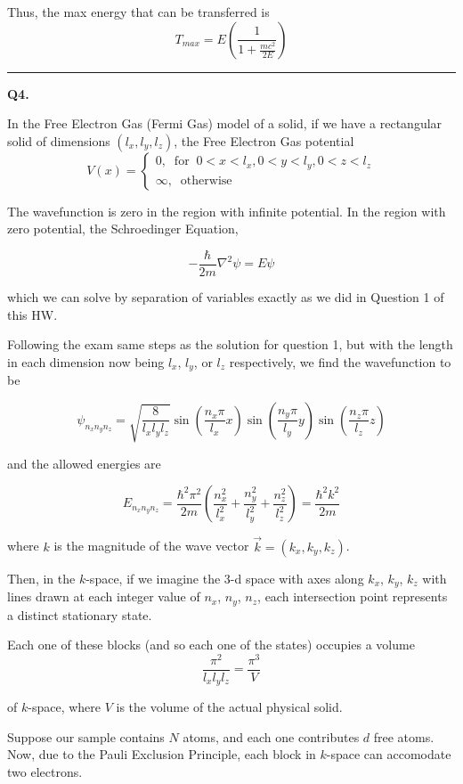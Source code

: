 \documentclass[twoside]{article}
\begin{document}
Thus, the max energy that can be transferred is 
\[ \boxed{T_{max} = E \left( \frac{1}{1 + \frac{mc^2}{2E}} \right)} \]

\vskip 0.25cm
\hrule
\vskip 1cm

\textbf{Q4.} 

In the Free Electron Gas (Fermi Gas) model of a solid, if we have a rectangular solid of dimensions $(l_x, l_y, l_z)$, the Free Electron Gas potential 
\[ V(x) = \begin{cases}
   0,\;\;\text{for}\;\; 0 < x < l_x , 0 < y < l_y, 0 < z < l_z \\
   \infty,\;\;\text{otherwise} 
\end{cases} \]

The wavefunction is zero in the region with infinite potential. In the region with zero potential, the Schroedinger Equation,

\[ -\frac{\hbar}{2m} \nabla^2 \psi = E\psi \]

which we can solve by separation of variables exactly as we did in Question 1 of this HW.

Following the exam same steps as the solution for question 1, but with the length in each dimension now being $l_x$, $l_y$, or $l_z$ respectively, we find the wavefunction to be

\[ \psi_{n_x n_y n_z} = \sqrt{\frac{8}{l_x l_y l_z}} \sin\left( \frac{n_x \pi}{l_x} x \right) \sin\left( \frac{n_y \pi}{l_y} y \right) \sin\left( \frac{n_z \pi}{l_z} z \right)  \]

and the allowed energies are 

\[ E_{n_x n_y n_z} = \frac{\hbar^2 \pi^2}{2m} \left( \frac{n_x^2}{l_x^2} + \frac{n_y^2}{l_y^2} + \frac{n_z^2}{l_z^2} \right) = \frac{\hbar^2 k^2}{2m} \]

where $k$ is the magnitude of the wave vector $\vec{k} = (k_x, k_y, k_z)$.

Then, in the $k$-space, if we imagine the 3-d space with axes along $k_x$, $k_y$, $k_z$ with lines drawn at each integer value of $n_x$, $n_y$, $n_z$, each intersection point represents a distinct stationary state.

Each one of these blocks (and so each one of the states) occupies a volume 
\[ \frac{\pi^2}{l_x l_y l_z} = \frac{\pi^3}{V} \]

of $k$-space, where $V$ is the volume of the actual physical solid.

Suppose our sample contains $N$ atoms, and each one contributes $d$ free atoms. Now, due to the Pauli Exclusion Principle, each block in $k$-space can accomodate two electrons.
\end{document}

